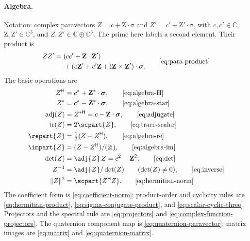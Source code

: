 \documentclass[11pt]{article}
\newcommand{\pv}[1]{{#1}}
\newcommand{\vstyle}[1]{{\bm{\mathrm{#1}}}}
\newcommand{\pZ}{\pv{Z}}
\numberwithin{equation}{section}
\newcommand{\C}{\mathbb{C}}
\newcommand{\ii}{\mathrm{i}}
\newcommand{\dotprod}{\cdot}
\newcommand{\bsig}{\vstyle{\sigma}}
\newcommand{\bZ}{\vstyle{Z}}
\begin{document}
\paragraph{Algebra.}
Notation: complex paravectors $\pZ=c+\bZ\dotprod\bsig$ and $\pZ'=c'+\bZ'\dotprod\bsig$,
with $c,c'\in\C$, $\bZ,\bZ'\in\C^3$, and $\pZ,\pZ'\in\C\oplus\C^3$.
The prime here labels a second element.  Their product is
\begin{equation*}
 \begin{aligned}
 \pZ \pZ'={}&(cc'+\bZ\dotprod\bZ')\\
 &+(c\bZ'+c'\bZ+\ii\bZ\times\bZ')\dotprod\bsig.
 \end{aligned}\tag*{\eqref{eq:para-product}}
\end{equation*}
The basic operations are
\begin{align*}
 \pZ^{\mathsf H}&=c^*+\bZ^*\dotprod\bsig,
   \tag*{\eqref{eq:algebra-H}}\\
 \pZ^*&=c^*-\bZ^*\dotprod\bsig,
   \tag*{\eqref{eq:algebra-star}}\\
 \operatorname{adj}(\pZ)&=\pZ^{*\mathsf H}=c-\bZ\dotprod\bsig,
   \tag*{\eqref{eq:adjugate}}\\
 \operatorname{tr}(\pZ)&=2\scpart {\pZ},
   \tag*{\eqref{eq:trace-scalar}}\\
 \repart {\pZ}&=\tfrac12(\pZ+\pZ^{\mathsf H}),
   \tag*{\eqref{eq:algebra-re}}\\
 \impart {\pZ}&=(\pZ-\pZ^{\mathsf H})/(2\ii),
   \tag*{\eqref{eq:algebra-im}}\\
 \det(\pZ)&=\adj {\pZ}\,\pZ=c^2-\bZ^2,
   \tag*{\eqref{eq:det}}\\
 \pZ^{-1}&=\adj {\pZ}/\det(\pZ)\qquad(\det(\pZ)\ne0),
   \tag*{\eqref{eq:inverse}}\\
 \lVert \pZ\rVert^2&=\scpart{\pZ^{\mathsf H}\pZ}.
   \tag*{\eqref{eq:hermitian-norm}}
\end{align*}
The coefficient form is \eqref{eq:coefficient-norm}; product-order and
cyclicity rules are \eqref{eq:hermitian-product},
\eqref{eq:sigma-conjugate-product}, and \eqref{eq:scalar-cyclic-three}.
Projectors and the spectral rule are \eqref{eq:projectors} and
\eqref{eq:complex-function-projectors}.  The quaternion component map is
\eqref{eq:quaternion-paravector}; matrix images are
\eqref{eq:matrix} and \eqref{eq:quaternion-matrix}.

\end{document}
